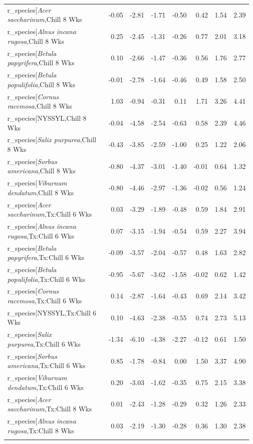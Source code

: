 \documentclass{article}\usepackage[]{graphicx}\usepackage[]{color}
\begin{document}
\begin{longtable}{lrrrrrrr}
  r_species[\textit{Acer saccharinum},Chill 8 Wks & -0.05 & -2.81 & -1.71 & -0.50 & 0.42 & 1.54 & 2.39 \\ 
  r_species[\textit{Alnus incana rugosa},Chill 8 Wks & 0.25 & -2.45 & -1.31 & -0.26 & 0.77 & 2.01 & 3.18 \\ 
  r_species[\textit{Betula papyrifera},Chill 8 Wks & 0.10 & -2.66 & -1.47 & -0.36 & 0.56 & 1.76 & 2.77 \\ 
  r_species[\textit{Betula populifolia},Chill 8 Wks & -0.01 & -2.78 & -1.64 & -0.46 & 0.49 & 1.58 & 2.50 \\ 
  r_species[\textit{Cornus racemosa},Chill 8 Wks & 1.03 & -0.94 & -0.31 & 0.11 & 1.71 & 3.26 & 4.41 \\ 
  r_species[NYSSYL,Chill 8 Wks & -0.04 & -4.58 & -2.54 & -0.63 & 0.58 & 2.39 & 4.46 \\ 
  r_species[\textit{Salix purpurea},Chill 8 Wks & -0.43 & -3.85 & -2.59 & -1.00 & 0.25 & 1.22 & 2.06 \\ 
  r_species[\textit{Sorbus americana},Chill 8 Wks & -0.80 & -4.37 & -3.01 & -1.40 & -0.01 & 0.64 & 1.32 \\ 
  r_species[\textit{Viburnum dendatum},Chill 8 Wks & -0.80 & -4.46 & -2.97 & -1.36 & -0.02 & 0.56 & 1.24 \\ 
  r_species[\textit{Acer saccharinum},Tx:Chill 6 Wks & 0.03 & -3.29 & -1.89 & -0.48 & 0.59 & 1.84 & 2.91 \\ 
  r_species[\textit{Alnus incana rugosa},Tx:Chill 6 Wks & 0.07 & -3.15 & -1.94 & -0.54 & 0.59 & 2.27 & 3.94 \\ 
  r_species[\textit{Betula papyrifera},Tx:Chill 6 Wks & -0.09 & -3.57 & -2.04 & -0.57 & 0.48 & 1.63 & 2.82 \\ 
  r_species[\textit{Betula populifolia},Tx:Chill 6 Wks & -0.95 & -5.67 & -3.62 & -1.58 & -0.02 & 0.62 & 1.42 \\ 
  r_species[\textit{Cornus racemosa},Tx:Chill 6 Wks & 0.14 & -2.87 & -1.64 & -0.43 & 0.69 & 2.14 & 3.42 \\ 
  r_species[NYSSYL,Tx:Chill 6 Wks & 0.10 & -4.63 & -2.38 & -0.55 & 0.74 & 2.73 & 5.13 \\ 
  r_species[\textit{Salix purpurea},Tx:Chill 6 Wks & -1.34 & -6.10 & -4.38 & -2.27 & -0.12 & 0.61 & 1.50 \\ 
  r_species[\textit{Sorbus americana},Tx:Chill 6 Wks & 0.85 & -1.78 & -0.84 & 0.00 & 1.50 & 3.37 & 4.90 \\ 
  r_species[\textit{Viburnum dendatum},Tx:Chill 6 Wks & 0.20 & -3.03 & -1.62 & -0.35 & 0.75 & 2.15 & 3.38 \\ 
  r_species[\textit{Acer saccharinum},Tx:Chill 8 Wks & 0.01 & -2.43 & -1.28 & -0.29 & 0.32 & 1.26 & 2.33 \\ 
  r_species[\textit{Alnus incana rugosa},Tx:Chill 8 Wks & 0.03 & -2.19 & -1.30 & -0.28 & 0.36 & 1.30 & 2.38 \\ 
   \hline
\hline
\label{tab:suppmodchl}
\end{longtable}
\end{document}

